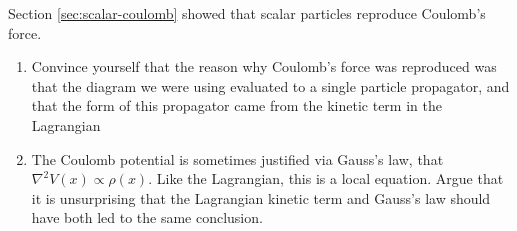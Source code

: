 \begin{problem}
  Section \ref{sec:scalar-coulomb} showed that scalar particles reproduce Coulomb's force.
  \begin{enumerate}
    \item Convince yourself that the reason why Coulomb's force was reproduced was that the diagram we were using evaluated to a single particle propagator, and that the form of this propagator came from the kinetic term in the Lagrangian
    \item The Coulomb potential is sometimes justified via Gauss's law, that $\nabla^2 V(x) \propto \rho(x)$. Like the Lagrangian, this is a local equation. Argue that it is unsurprising that the Lagrangian kinetic term and Gauss's law should have both led to the same conclusion.
  \end{enumerate}
\end{problem}